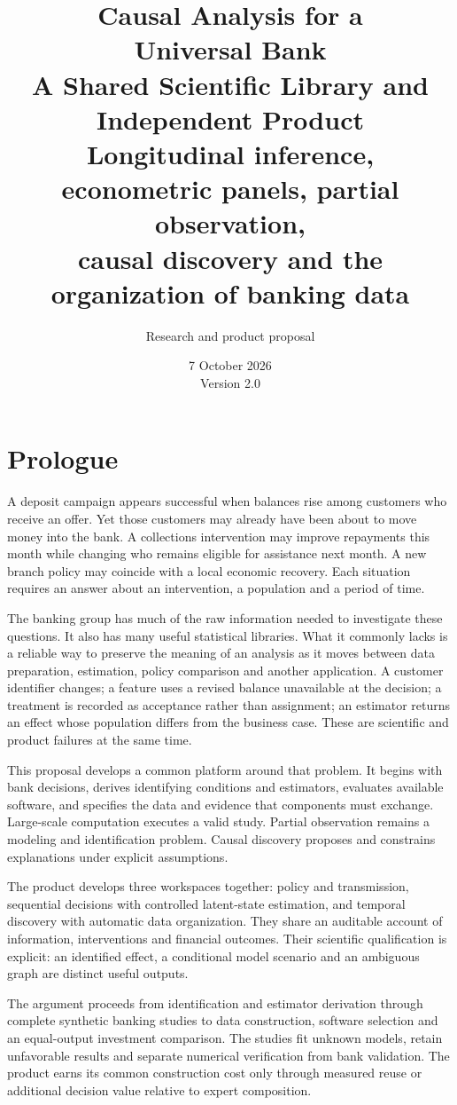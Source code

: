 \documentclass[11pt,a4paper,openany]{book}
\title{\sffamily\bfseries\color{ink}\Huge Causal Analysis for a\\Universal Bank\\[16pt]
\Large A Shared Scientific Library and Independent Product\\[8pt]
\large Longitudinal inference, econometric panels, partial observation,\\causal discovery and the organization of banking data}
\author{Research and product proposal}
\date{7 October 2026\\Version 2.0}
\begin{document}
\frontmatter
\maketitle
\chapter*{Prologue}
A deposit campaign appears successful when balances rise among customers who
receive an offer. Yet those customers may already have been about to move money
into the bank. A collections intervention may improve repayments this month
while changing who remains eligible for assistance next month. A new branch
policy may coincide with a local economic recovery. Each situation requires an
answer about an intervention, a population and a period of time.

The banking group has much of the raw information needed to investigate these
questions. It also has many useful statistical libraries. What it commonly lacks
is a reliable way to preserve the meaning of an analysis as it moves between
data preparation, estimation, policy comparison and another application. A
customer identifier changes; a feature uses a revised balance unavailable at
the decision; a treatment is recorded as acceptance rather than assignment; an
estimator returns an effect whose population differs from the business case.
These are scientific and product failures at the same time.

This proposal develops a common platform around that problem. It begins with
bank decisions, derives identifying conditions and estimators, evaluates
available software, and specifies the data and evidence that components must
exchange. Large-scale computation executes a valid study. Partial observation
remains a modeling and identification problem. Causal discovery proposes and
constrains explanations under explicit assumptions.

The product develops three workspaces together: policy and transmission,
sequential decisions with controlled latent-state estimation, and temporal
discovery with automatic data organization. They share an auditable account
of information, interventions and financial outcomes. Their scientific
qualification is explicit: an identified effect, a conditional model scenario
and an ambiguous graph are distinct useful outputs.

The argument proceeds from identification and estimator derivation through
complete synthetic banking studies to data construction, software selection
and an equal-output investment comparison. The studies fit unknown models,
retain unfavorable results and separate numerical verification from bank
validation. The product earns its common construction cost only through
measured reuse or additional decision value relative to expert composition.
\end{document}
